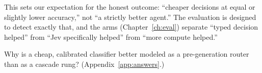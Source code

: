\begin{whyhere}
This sets our expectation for the honest outcome: ``cheaper decisions at equal or slightly
lower accuracy,'' not ``a strictly better agent.'' The evaluation is designed to detect
exactly that, and the arms (Chapter~\ref{ch:eval}) separate ``typed decision helped'' from
``Jev specifically helped'' from ``more compute helped.''
\end{whyhere}

\begin{checkbox}
Why is a cheap, calibrated classifier better modeled as a pre-generation router than as a
cascade rung? (Appendix~\ref{app:answers}.)
\end{checkbox}

